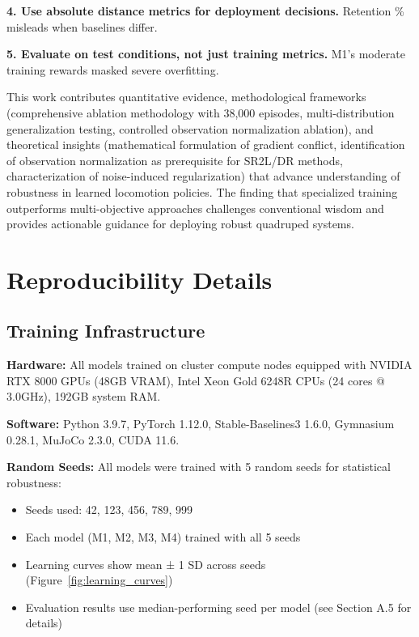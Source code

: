 \documentclass[conference]{IEEEtran}
\begin{document}
\textbf{4. Use absolute distance metrics for deployment decisions.} Retention \% misleads when baselines differ.

\textbf{5. Evaluate on test conditions, not just training metrics.} M1's moderate training rewards masked severe overfitting.

This work contributes quantitative evidence, methodological frameworks (comprehensive ablation methodology with 38,000 episodes, multi-distribution generalization testing, controlled observation normalization ablation), and theoretical insights (mathematical formulation of gradient conflict, identification of observation normalization as prerequisite for SR2L/DR methods, characterization of noise-induced regularization) that advance understanding of robustness in learned locomotion policies. The finding that specialized training outperforms multi-objective approaches challenges conventional wisdom and provides actionable guidance for deploying robust quadruped systems.




\appendix

\section{Reproducibility Details}
\label{sec:reproducibility}

\subsection{Training Infrastructure}

\textbf{Hardware:} All models trained on cluster compute nodes equipped with NVIDIA RTX 8000 GPUs (48GB VRAM), Intel Xeon Gold 6248R CPUs (24 cores @ 3.0GHz), 192GB system RAM.

\textbf{Software:} Python 3.9.7, PyTorch 1.12.0, Stable-Baselines3 1.6.0, Gymnasium 0.28.1, MuJoCo 2.3.0, CUDA 11.6.

\textbf{Random Seeds:} All models were trained with 5 random seeds for statistical robustness:
\begin{itemize}
    \item Seeds used: 42, 123, 456, 789, 999
    \item Each model (M1, M2, M3, M4) trained with all 5 seeds
    \item Learning curves show mean ± 1 SD across seeds (Figure~\ref{fig:learning_curves})
    \item Evaluation results use median-performing seed per model (see Section A.5 for details)
\end{itemize}
\end{document}
